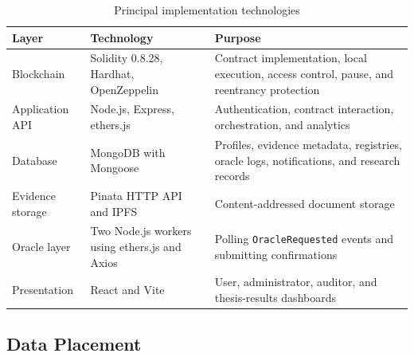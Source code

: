 \begin{table}[htbp]
\centering
\caption{Principal implementation technologies}
\label{tab:technology_stack_methodology}
\begin{tabular}{|p{4.0cm}|p{4.8cm}|p{5.2cm}|}
\hline
\textbf{Layer} & \textbf{Technology} & \textbf{Purpose} \\
\hline
Blockchain & Solidity 0.8.28, Hardhat, OpenZeppelin & Contract implementation,
local execution, access control, pause, and reentrancy protection \\
\hline
Application API & Node.js, Express, ethers.js & Authentication, contract
interaction, orchestration, and analytics \\
\hline
Database & MongoDB with Mongoose & Profiles, evidence metadata, registries,
oracle logs, notifications, and research records \\
\hline
Evidence storage & Pinata HTTP API and IPFS & Content-addressed document storage \\
\hline
Oracle layer & Two Node.js workers using ethers.js and Axios & Polling
\texttt{OracleRequested} events and submitting confirmations \\
\hline
Presentation & React and Vite & User, administrator, auditor, and thesis-results
dashboards \\
\hline
\end{tabular}
\end{table}

\subsection{Data Placement}

